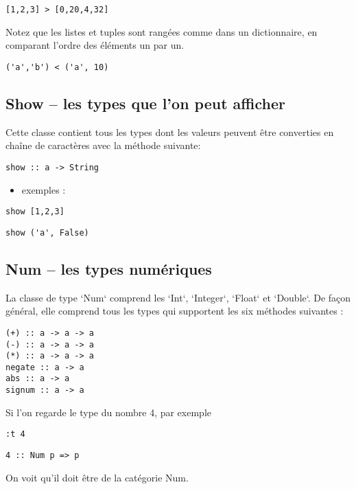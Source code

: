 \documentclass[11pt]{article}
\begin{document}
\begin{verbatim}
[1,2,3] > [0,20,4,32]
\end{verbatim}

Notez que les listes et tuples sont rangées comme dans un dictionnaire, en comparant l'ordre des éléments  un par un.

\begin{verbatim}
('a','b') < ('a', 10)
\end{verbatim}

\subsection{Show --  les types que l'on peut afficher}
\label{sec:orge10a605}
Cette classe contient tous les types dont les valeurs peuvent être converties en chaîne de caractères avec la méthode suivante:

\begin{verbatim}
show :: a -> String
\end{verbatim}


\begin{itemize}
\item exemples :
\end{itemize}
\begin{verbatim}
show [1,2,3]
\end{verbatim}

\begin{verbatim}
show ('a', False)
\end{verbatim}

\subsection{Num --  les types numériques}
\label{sec:orgc9f1c71}
La classe de type `Num` comprend les `Int`, `Integer`, `Float` et  `Double`.  De façon général, elle comprend  tous les types qui supportent les six méthodes suivantes :
\begin{verbatim}
(+) :: a -> a -> a
(-) :: a -> a -> a
(*) :: a -> a -> a
negate :: a -> a
abs :: a -> a
signum :: a -> a
\end{verbatim}


Si l'on regarde le type du nombre 4, par exemple
\begin{verbatim}
:t 4
\end{verbatim}
\begin{verbatim}
4 :: Num p => p
\end{verbatim}


On voit qu'il doit être de la catégorie Num.
\end{document}
